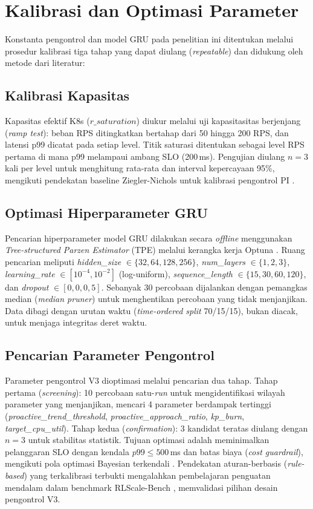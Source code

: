 \section{Kalibrasi dan Optimasi Parameter}
\label{sec:kalibrasi-optimasi}

Konstanta pengontrol dan model GRU pada penelitian ini ditentukan melalui prosedur kalibrasi tiga tahap yang dapat diulang (\emph{repeatable}) dan didukung oleh metode dari literatur:

\subsection{Kalibrasi Kapasitas}

Kapasitas efektif K8s ($r\_saturation$) diukur melalui uji kapasitasitas berjenjang (\emph{ramp test}): beban RPS ditingkatkan bertahap dari 50 hingga 200 RPS, dan latensi p99 dicatat pada setiap level. Titik saturasi ditentukan sebagai level RPS pertama di mana p99 melampaui ambang SLO (200\,ms). Pengujian diulang $n = 3$ kali per level untuk menghitung rata-rata dan interval kepercayaan 95\%, mengikuti pendekatan baseline Ziegler-Nichols untuk kalibrasi pengontrol PI \citep{yang2019elax}.

\subsection{Optimasi Hiperparameter GRU}

Pencarian hiperparameter model GRU dilakukan secara \emph{offline} menggunakan \emph{Tree-structured Parzen Estimator} (TPE) melalui kerangka kerja Optuna \citep{optuna2019}. Ruang pencarian meliputi \emph{hidden\_size} $\in \{32, 64, 128, 256\}$, \emph{num\_layers} $\in \{1, 2, 3\}$, \emph{learning\_rate} $\in [10^{-4}, 10^{-2}]$ (log-uniform), \emph{sequence\_length} $\in \{15, 30, 60, 120\}$, dan \emph{dropout} $\in [0, 0, 0,5]$. Sebanyak 30 percobaan dijalankan dengan pemangkas median (\emph{median pruner}) untuk menghentikan percobaan yang tidak menjanjikan. Data dibagi dengan urutan waktu (\emph{time-ordered split} 70/15/15), bukan diacak, untuk menjaga integritas deret waktu.

\subsection{Pencarian Parameter Pengontrol}

Parameter pengontrol V3 dioptimasi melalui pencarian dua tahap. Tahap pertama (\emph{screening}): 10 percobaan satu-\emph{run} untuk mengidentifikasi wilayah parameter yang menjanjikan, mencari 4 parameter berdampak tertinggi (\emph{proactive\_trend\_threshold}, \emph{proactive\_approach\_ratio}, \emph{kp\_burn}, \emph{target\_cpu\_util}). Tahap kedua (\emph{confirmation}): 3 kandidat teratas diulang dengan $n = 3$ untuk stabilitas statistik. Tujuan optimasi adalah meminimalkan pelanggaran SLO dengan kendala $p99 \leq 500$\,ms dan batas biaya (\emph{cost guardrail}), mengikuti pola optimasi Bayesian terkendali \citep{pobo2024}. Pendekatan aturan-berbasis (\emph{rule-based}) yang terkalibrasi terbukti mengalahkan pembelajaran penguatan mendalam dalam benchmark RLScale-Bench \citep{rayscale2026}, memvalidasi pilihan desain pengontrol V3.

